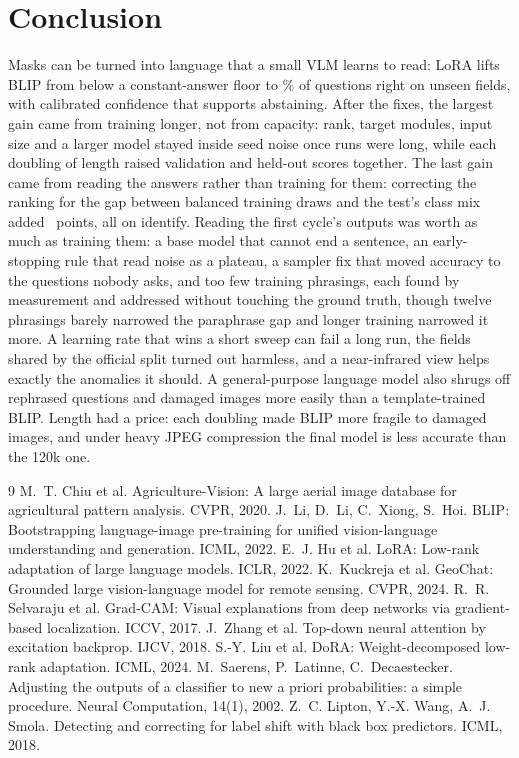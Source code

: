 \documentclass[10pt,twocolumn]{article}
\begin{document}
\section{Conclusion}
Masks can be turned into language that a small VLM learns to read: LoRA lifts BLIP from below a constant-answer floor to \blipCorrMean\% of questions right on unseen fields, with calibrated confidence that supports abstaining. After the fixes, the largest gain came from training longer, not from capacity: rank, target modules, input size and a larger model stayed inside seed noise once runs were long, while each doubling of length raised validation and held-out scores together. The last gain came from reading the answers rather than training for them: correcting the ranking for the gap between balanced training draws and the test's class mix added \corrChange\ points, all on identify. Reading the first cycle's outputs was worth as much as training them: a base model that cannot end a sentence, an early-stopping rule that read noise as a plateau, a sampler fix that moved accuracy to the questions nobody asks, and too few training phrasings, each found by measurement and addressed without touching the ground truth, though twelve phrasings barely narrowed the paraphrase gap and longer training narrowed it more. A learning rate that wins a short sweep can fail a long run, the fields shared by the official split turned out harmless, and a near-infrared view helps exactly the anomalies it should. A general-purpose language model also shrugs off rephrased questions and damaged images more easily than a template-trained BLIP. Length had a price: each doubling made BLIP more fragile to damaged images, and under heavy JPEG compression the final model is less accurate than the 120k one.

\begin{thebibliography}{9}\small
{} M.~T. Chiu et al. Agriculture-Vision: A large aerial image database for agricultural pattern analysis. CVPR, 2020.
 J.~Li, D.~Li, C.~Xiong, S.~Hoi. BLIP: Bootstrapping language-image pre-training for unified vision-language understanding and generation. ICML, 2022.
 E.~J. Hu et al. LoRA: Low-rank adaptation of large language models. ICLR, 2022.
 K.~Kuckreja et al. GeoChat: Grounded large vision-language model for remote sensing. CVPR, 2024.
 R.~R. Selvaraju et al. Grad-CAM: Visual explanations from deep networks via gradient-based localization. ICCV, 2017.
 J.~Zhang et al. Top-down neural attention by excitation backprop. IJCV, 2018.
 S.-Y. Liu et al. DoRA: Weight-decomposed low-rank adaptation. ICML, 2024.
 M.~Saerens, P.~Latinne, C.~Decaestecker. Adjusting the outputs of a classifier to new a priori probabilities: a simple procedure. Neural Computation, 14(1), 2002.
 Z.~C. Lipton, Y.-X. Wang, A.~J. Smola. Detecting and correcting for label shift with black box predictors. ICML, 2018.
\end{thebibliography}
\end{document}
